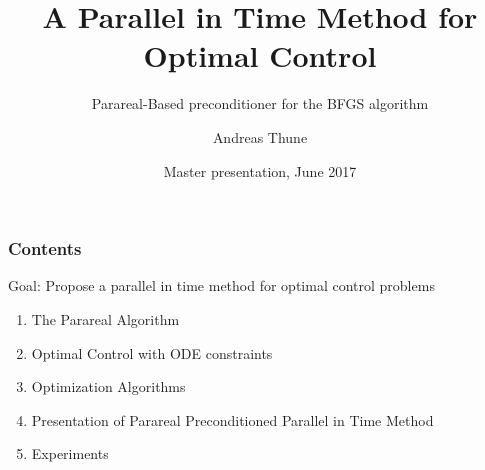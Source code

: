 \documentclass[9pt]{beamer}
\title{A Parallel in Time Method for Optimal Control}
\subtitle{Parareal-Based preconditioner for the BFGS algorithm}
\author{Andreas Thune}
\institute[UiO]{Faculty of Mathematics \\University of Oslo}
\date{Master presentation, June 2017}
\begin{document}
 
\frame{\titlepage}
\begin{frame}
\frametitle{Contents}
\begin{block}{}
\centering
\alert{Goal}: Propose a parallel in time method for optimal control problems
\end{block}
\begin{enumerate}[I]
\item{The Parareal Algorithm}
\item{Optimal Control with ODE constraints}
\item{Optimization Algorithms}
\item{Presentation of Parareal Preconditioned Parallel in Time Method}
\item{Experiments}
\end{enumerate}
\end{frame}
\end{document}
